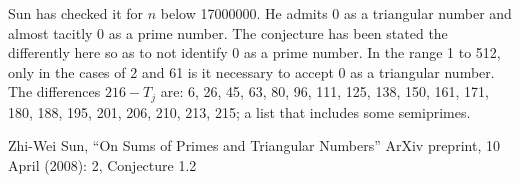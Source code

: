 \documentclass[12pt]{article}
\begin{document}
Sun has checked it for $n$ below 17000000. He admits 0 as a triangular number and almost tacitly 0 as a prime number. The conjecture has been stated the differently here so as to not identify 0 as a prime number. In the range 1 to 512, only in the cases of 2 and 61 is it necessary to accept 0 as a triangular number. The differences $216 - T_j$ are: 6, 26, 45, 63, 80, 96, 111, 125, 138, 150, 161, 171, 180, 188, 195, 201, 206, 210, 213, 215; a list that includes some semiprimes.

\begin{thebibliography}{1}
 Zhi-Wei Sun, ``On Sums of Primes and Triangular Numbers'' ArXiv preprint, 10 April (2008): 2, Conjecture 1.2
\end{thebibliography}
\end{document}
